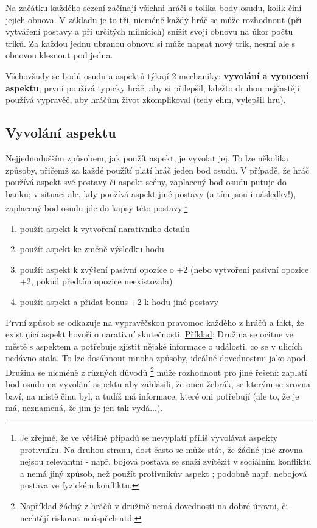 Na začátku každého sezení začínají všichni hráči s tolika body osudu, kolik činí jejich obnova. V základu je to tři, nicméně každý hráč se může rozhodnout (při vytváření postavy a při určitých milnících) snížit svoji obnovu na úkor počtu triků. Za každou jednu ubranou obnovu si může napsat nový trik, nesmí ale s obnovou klesnout pod jedna.

Všehovšudy se bodů osudu a aspektů týkají 2 mechaniky: \textbf{vyvolání a vynucení aspektu}; první používá typicky hráč, aby si přilepšil, kdežto druhou nejčastěji používá vypravěč, aby hráčům život zkomplikoval (tedy ehm, vylepšil hru).

\subsection{Vyvolání aspektu}
\label{sec:vyvolani-aspektu}

Nejjednodušším způsobem, jak použít aspekt, je vyvolat jej. To lze několika způsoby, přičemž za každé použítí platí hráč jeden bod osudu. V případě, že hráč používá aspekt své postavy či aspekt scény, zaplacený bod osudu putuje do banku; v situaci ale, kdy používá aspekt jiné postavy (a tím jsou i následky!), zaplacený bod osudu jde do kapsy této postavy.\footnote{Je zřejmé, že ve většině případů se nevyplatí příliš vyvolávat aspekty protivníku. Na druhou stranu, dost často se může stát, že žádné jiné zrovna nejsou relevantní - např. bojová postava se snaží zvítězit v sociálním konfliktu a nemá jiný způsob, než použít protivníkův aspekt ; podobně např. nebojová postava ve fyzickém konfliktu.}

\begin{enumerate}
\item použít aspekt k vytvoření narativního detailu
\item použít aspekt ke změně výsledku hodu
\item použít aspekt k zvýšení pasivní opozice o +2 (nebo vytvoření pasivní opozice +2, pokud předtím opozice neexistovala)
\item použít aspekt a přidat bonus +2 k hodu jiné postavy
\end{enumerate}

První způsob se odkazuje na vypravěčskou pravomoc každého z hráčů a fakt, že existující aspekt hovoří o narativní skutečnosti. \underline{Příklad}:
Družina se ocitne ve městě s aspektem  a potřebuje zjistit nějaké informace o události, co se v ulicích nedávno stala. To lze dosáhnout mnoha způsoby, ideálně dovednostmi jako  apod. Družina se nicméně z různých důvodů \footnote{Například žádný z hráčů v družině nemá dovednosti na dobré úrovni, či nechtějí riskovat neúspěch atd.} může rozhodnout pro jiné řešení: zaplatí bod osudu na vyvolání aspektu  aby zahlásili, že onen žebrák, se kterým se zrovna baví, na místě činu byl, a tudíž má informace, které oni potřebují (ale to, že je má, neznamená, že jim je jen tak vydá...).\\

